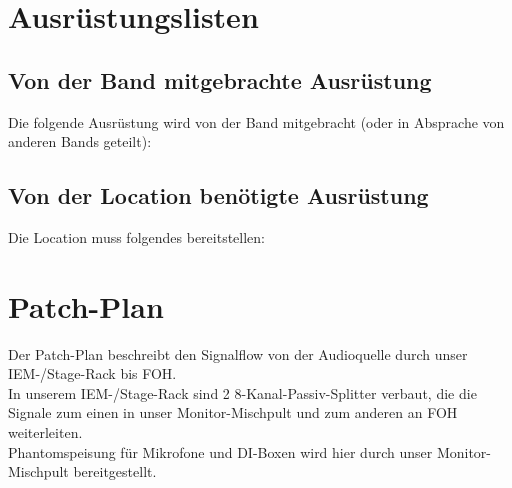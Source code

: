 \documentclass{techrider}  %
\begin{document}







\maketitle


\section{Ausrüstungslisten}

\subsection{Von der Band mitgebrachte Ausrüstung}

Die folgende Ausrüstung wird von der Band mitgebracht (oder in Absprache von anderen Bands geteilt):

\bandEquipmentTable
\newpage
\subsection{Von der Location benötigte Ausrüstung}  

Die Location muss folgendes bereitstellen:

\venueRequirementsTable

\newpage
\section{Patch-Plan}

Der Patch-Plan beschreibt den Signalflow von der Audioquelle durch unser IEM-/Stage-Rack bis FOH. \\
In unserem IEM-/Stage-Rack sind 2 8-Kanal-Passiv-Splitter verbaut, die die Signale zum einen in unser Monitor-Mischpult und zum anderen an FOH weiterleiten. \\
Phantomspeisung für Mikrofone und DI-Boxen wird hier durch unser Monitor-Mischpult bereitgestellt.
\end{document}

